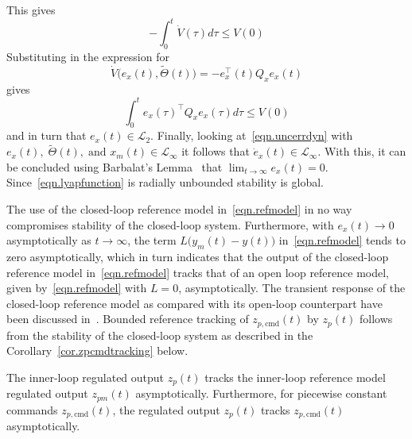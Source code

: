 \begin{proof-dan}
  This gives
  \begin{equation*}
    -\int_{0}^{t}\dot{V}(\tau)d\tau\leq V(0)
  \end{equation*}
  Substituting in the expression for
  \begin{equation*}
    \dot{V}\bigr(e_{x}(t),\widetilde{\Theta}(t)\bigr) = -e_{x}^{\top}(t)Q_{x}e_{x}(t)
  \end{equation*}
  gives
  \begin{equation*}
    \int_{0}^{t}e_{x}(\tau)^{\top}Q_{x}e_{x}(\tau)d\tau\leq V(0)
  \end{equation*}
  and in turn that $e_{x}(t)\in\mathcal{L}_{2}$.
  Finally, looking at\ \eqref{eqn.uncerrdyn} with $e_{x}(t), \; \widetilde{\Theta}(t), \;\text{and } x_{m}(t)\in\mathcal{L}_{\infty}$ it follows that $\dot{e}_{x}(t)\in\mathcal{L}_{\infty}$.
  With this, it can be concluded using Barbalat's Lemma\ \cite{narendra.stable.2005} that $\lim_{t\rightarrow\infty}e_{x}(t)=0$.
  Since\ \eqref{eqn.lyapfunction} is radially unbounded stability is global.
\end{proof-dan}

\begin{rem-dan}
  The use of the closed-loop reference model in\ \eqref{eqn.refmodel} in no way compromises stability of the closed-loop system.
  Furthermore, with $e_{x}(t)\rightarrow0$ asymptotically as $t\rightarrow\infty$, the term $L\bigr(y_{m}(t)-y(t)\bigr)$ in\ \eqref{eqn.refmodel} tends to zero asymptotically, which in turn indicates that the output of the closed-loop reference model in\ \eqref{eqn.refmodel} tracks that of an open loop reference model, given by\ \eqref{eqn.refmodel} with $L=0$, asymptotically.
  The transient response of the closed-loop reference model as compared with its open-loop counterpart have been discussed in\ \cite{gibson.acc.2013,gibson.ecc.2013,gibson.ieeeaccess.2013}.
  Bounded reference tracking of $z_{p,\text{cmd}}(t)$ by $z_{p}(t)$ follows from  the stability of the closed-loop system as described in the Corollary~\ref{cor.zpcmdtracking} below.
\end{rem-dan}

\begin{cor-dan}\label{cor.zpcmdtracking}
  The inner-loop regulated output $z_{p}(t)$ tracks the inner-loop reference model regulated output $z_{pm}(t)$ asymptotically.
  Furthermore, for piecewise constant commands $z_{p,\text{cmd}}(t)$, the regulated output $z_{p}(t)$ tracks $z_{p,\text{cmd}}(t)$ asymptotically.
\end{cor-dan}

